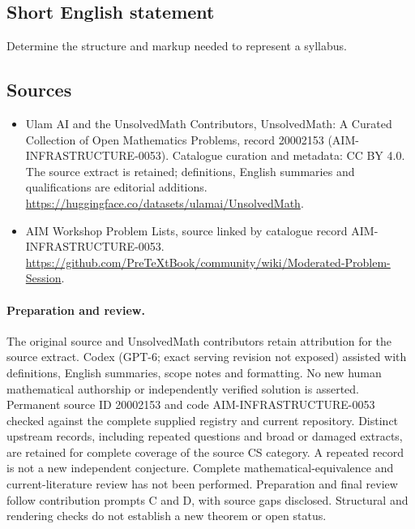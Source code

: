 \documentclass[11pt]{article}
\begin{document}
\subsection{Short English statement}
Determine the structure and markup needed to represent a syllabus.
\subsection{Sources}
\begin{itemize}
\item[\hypertarget{source:20002153:1}{S1}] Ulam AI and the UnsolvedMath Contributors, UnsolvedMath: A Curated Collection of Open Mathematics Problems, record 20002153 (AIM-INFRASTRUCTURE-0053). Catalogue curation and metadata: CC BY 4.0. The source extract is retained; definitions, English summaries and qualifications are editorial additions.
\url{https://huggingface.co/datasets/ulamai/UnsolvedMath}.
\item[\hypertarget{source:20002153:2}{S2}] AIM Workshop Problem Lists, source linked by catalogue record AIM-INFRASTRUCTURE-0053.
\url{https://github.com/PreTeXtBook/community/wiki/Moderated-Problem-Session}.
\end{itemize}
\paragraph{Preparation and review.}
The original source and UnsolvedMath contributors retain attribution for the source extract. Codex (GPT-6; exact serving revision not exposed) assisted with definitions, English summaries, scope notes and formatting. No new human mathematical authorship or independently verified solution is asserted. Permanent source ID 20002153 and code AIM-INFRASTRUCTURE-0053 checked against the complete supplied registry and current repository. Distinct upstream records, including repeated questions and broad or damaged extracts, are retained for complete coverage of the source CS category. A repeated record is not a new independent conjecture. Complete mathematical-equivalence and current-literature review has not been performed. Preparation and final review follow contribution prompts C and D, with source gaps disclosed. Structural and rendering checks do not establish a new theorem or open status.
\label{end:20002153}
\end{document}
